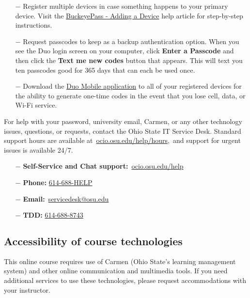 \documentclass[12pt,letter,english]{report}
\providecommand{\tightlist}{%
      \setlength{\itemsep}{0pt}\setlength{\parskip}{0pt}%
}
\begin{document}
\begin{itemize}
      \item[$-$]
            Register multiple devices in case something happens to your primary device. Visit the \href{https://osuitsm.service-now.com/selfservice/kb_view.do?sysparm_article=kb05025}{BuckeyePass - Adding a Device} help article for step-by-step instructions.
      \item[$-$]
            Request passcodes to keep as a backup authentication option. When you see the Duo login screen on your computer, click \textbf{Enter a Passcode} and then click the \textbf{Text me new codes} button that appears. This will text you ten passcodes good for 365 days that can each be used once.
      \item[$-$]
            Download the \href{https://osuitsm.service-now.com/selfservice/kb_view.do?sysparm_article=kb05026}{Duo Mobile application} to all of your registered devices for the ability to generate one-time codes in the event that you lose cell, data, or Wi-Fi service.
\end{itemize}

For help with your password, university email, Carmen, or any other technology issues, questions, or requests, contact the Ohio State IT Service Desk. Standard support hours are available at~\href{https://ocio.osu.edu/help/hours}{ocio.osu.edu/help/hours},~and support for urgent issues is available 24/7.

\begin{itemize}
      \tightlist
      \item[$-$]
            \textbf{Self-Service and Chat support:}~\href{http://ocio.osu.edu/help}{ocio.osu.edu/help}
      \item[$-$]
            \textbf{Phone:} \href{tel:6146884357}{614-688-HELP}
      \item[$-$]
            \textbf{Email:}~\href{mailto:8help@osu.edu}{servicedesk@osu.edu}
      \item[$-$]
            \textbf{TDD:} \href{tel:6146888743}{614-688-8743}
\end{itemize}

\subsection{Accessibility of course technologies}

This online course requires use of Carmen (Ohio State's learning management system) and other online communication and multimedia tools. If you need additional services to use these technologies, please request accommodations with your instructor.~
\end{document}
